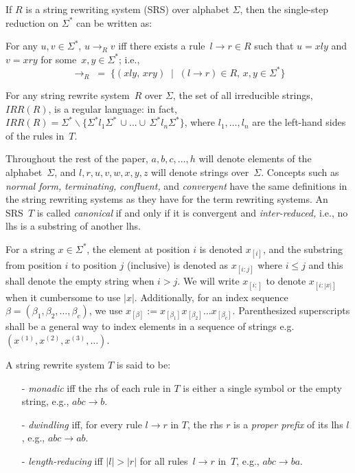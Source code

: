 \documentclass{lmcs} %
\theoremstyle{plain}\newtheorem{satz}[thm]{Satz} %
\newcommand{\flr}{\rightarrow}
\begin{document}
If $R$ is a string
rewriting system (SRS) over alphabet $\Sigma$, then the single-step
reduction on $\Sigma^*$ can be written as:

For any $u,v \in \Sigma^*$, $u \rightarrow_R v$ iff there exists 
a rule~$l \rightarrow r
\in R$ such that 
$u = xly$ and $v = xry$ for some~$x, y \in \Sigma^*$; 
i.e., \[ {\rightarrow}_R^{} \; = \; \{ (xly, \, xry) \; \mid \; (l \rightarrow r) \in R, 
  \, x,y \in {{\Sigma}^*} \} \] 

For any string rewrite system~$R$ over $\Sigma$, the set of all
irreducible strings, $IRR(R)$, is a regular
language: in fact, $IRR(R) = \Sigma_{}^* \smallsetminus \{\Sigma_{}^*
l_1 \Sigma_{}^* \,\cup ... \cup \, \Sigma_{}^* l_n \Sigma_{}^*\}$,
where $l_1,\dots, l_n$ are the left-hand sides of the rules in~$T$.

Throughout the rest of the paper, 
$a, b, c, \dots, h$  will denote elements of the alphabet~$\Sigma$, 
and $l, r, u, v, w, x, y,z$ will denote strings over~$\Sigma$. Concepts such as {\em normal form,\/}  {\em terminating,\/} 
{\em confluent,\/} and {\em convergent\/} have the same definitions in the string rewriting
systems as they have for the term rewriting systems.
An SRS~$T$ is called {\em canonical\/} if and only if it is convergent and
{\em inter-reduced,\/} i.e., no lhs is a substring of another lhs.


For a string $x\in \Sigma^*$, the element at position $i$ is denoted
$x_{[i]}$, and the substring from position $i$ to position $j$
(inclusive) is denoted as $x_{[i:j]}$ where $i\leq j$ and this shall
denote the empty string when $i>j$. We will write $x_{[i:]}$ to denote
$x_{[i:|x|]}$ when it cumbersome to use $|x|$. Additionally, for an index sequence
$\beta = (\beta_1,\beta_2,\dots , \beta_c)$, we use $x_{[\beta]} := x_{[\beta_1]}x_{[\beta_2]}\dots x_{[\beta_c]}$.
Parenthesized superscripts shall be a general way to index elements in a sequence of
strings e.g.  $(x^{(1)},x^{(2)},x^{(3)},\dots)$.


A  string rewrite system $T$ is said to be:
\begin{itemize}
\item[-] {\em monadic\/} iff the rhs of each rule in $T$ is either a single
 symbol or the empty string, e.g., $abc \rightarrow b$. \par 
\item[-] {\em dwindling\/} iff, for every rule $l \flr r$ in $T$, the rhs $r$ 
  is a {\em proper prefix\/} of its lhs $l$, e.g., $abc \rightarrow ab$. \par
\item[-] \emph{length-reducing} iff $| l | > | r |$ for all rules~$l \flr r$ in~$T$, e.g., $abc \rightarrow ba$.
\end{itemize}
\end{document}
